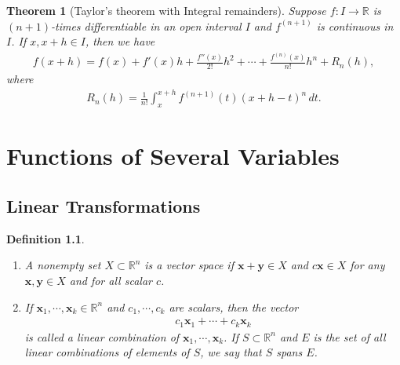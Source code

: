 \documentclass[10pt]{book}
\newtheorem{definition}{Definition}[chapter]
\newtheorem{theorem}{Theorem}[chapter]
\theoremstyle{definition}
\numberwithin{equation}{chapter}
\begin{document}
\medskip

\begin{theorem}[Taylor's theorem with Integral remainders]\label{th_629}
Suppose $f: I \to \mathbb{R}$ is $(n+1)$-times differentiable in an open interval $I$ and $f^{(n+1)}$ is continuous in $I$. If $x, x+h \in I$, then we have
\begin{align*}
    f(x + h) = f(x) + f'(x)h + \frac{f''(x)}{2!}h^2 + \cdots + \frac{f^{(n)}(x)}{n!}h^n + R_n(h),
\end{align*}
where
\begin{align*}
    R_n(h) = \frac{1}{n!} \int^{x+h}_x f^{(n+1)}(t) (x +  h - t)^n \,dt.
\end{align*}
\end{theorem}






\chapter{Functions of Several Variables}

\section{Linear Transformations}

\begin{definition}
~\begin{enumerate}[label=(\alph*)]
    \item A nonempty set $X \subset \mathbb{R}^n$ is a vector space if $\mathbf{x} + \mathbf{y} \in X$ and $c\mathbf{x} \in X$ for any $\mathbf{x}, \mathbf{y} \in X$ and for all scalar $c$.
    
    \item If $\mathbf{x}_1, \cdots, \mathbf{x}_k \in \mathbb{R}^n$ and $c_1, \cdots, c_k$ are scalars, then the vector 
    \begin{align*}
        c_1 \mathbf{x}_1 + \cdots + c_k \mathbf{x}_k
    \end{align*}
    is called a linear combination of $\mathbf{x}_1, \cdots, \mathbf{x}_k$. If $S \subset \mathbb{R}^n$ and $E$ is the set of all linear combinations of elements of $S$, we say that $S$ spans $E$.
\end{enumerate}
\end{definition}
\end{document}
